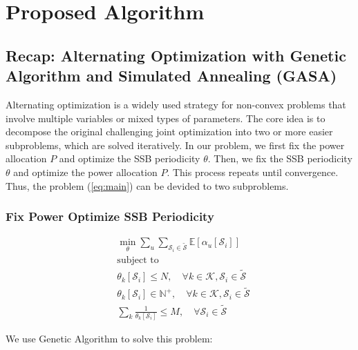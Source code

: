 \chapter{Proposed Algorithm}
\label{chap:algorithm}

\section{Recap: Alternating Optimization with Genetic Algorithm and Simulated Annealing (GASA)}

Alternating optimization is a widely used strategy for non-convex problems that involve multiple variables or mixed types of parameters. The core idea is to decompose the original challenging joint optimization into two or more easier subproblems, which are solved iteratively. In our problem, we first fix the power allocation $P$ and optimize the SSB periodicity $\theta$. Then, we fix the SSB periodicity $\theta$ and optimize the power allocation $P$. This process repeats until convergence. Thus, the problem (\ref{eq:main}) can be devided to two subproblems. 

\subsection{Fix Power Optimize SSB Periodicity}

\begin{subequations} \label{eq:FPOS}
\begin{align}
    &\min_{\theta} \sum_{u} \sum_{\mathcal{S}_i\in \mathcal{\widetilde{S}}} \mathbb{E}[\alpha_u[\mathcal{S}_i]] \\ 
    &\text{subject to} \nonumber \\
    &\theta_k[\mathcal{S}_i] \leq N, \quad \forall k\in\mathcal{K}, \mathcal{S}_i\in\mathcal{\widetilde{S}} \\
    &\theta_k[\mathcal{S}_i] \in \mathbb{N}^+, \quad \forall k\in\mathcal{K}, \mathcal{S}_i\in\mathcal{\widetilde{S}} \\
    &\sum_k \frac{1}{\theta_k[\mathcal{S}_i]} \leq M, \quad \forall \mathcal{S}_i\in\mathcal{\widetilde{S}}
\end{align}
\end{subequations}

We use Genetic Algorithm to solve this problem:

